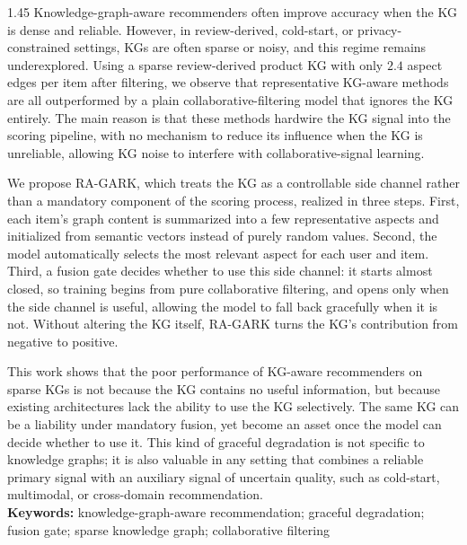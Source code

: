 \begin{spacing}{1.45}
Knowledge-graph-aware recommenders often improve accuracy when the KG is dense and reliable. However, in review-derived, cold-start, or privacy-constrained settings, KGs are often sparse or noisy, and this regime remains underexplored. Using a sparse review-derived product KG with only $2.4$ aspect edges per item after filtering, we observe that representative KG-aware methods are all outperformed by a plain collaborative-filtering model that ignores the KG entirely. The main reason is that these methods hardwire the KG signal into the scoring pipeline, with no mechanism to reduce its influence when the KG is unreliable, allowing KG noise to interfere with collaborative-signal learning.

We propose RA-GARK, which treats the KG as a controllable side channel rather than a mandatory component of the scoring process, realized in three steps. First, each item's graph content is summarized into a few representative aspects and initialized from semantic vectors instead of purely random values. Second, the model automatically selects the most relevant aspect for each user and item. Third, a fusion gate decides whether to use this side channel: it starts almost closed, so training begins from pure collaborative filtering, and opens only when the side channel is useful, allowing the model to fall back gracefully when it is not. Without altering the KG itself, RA-GARK turns the KG's contribution from negative to positive.

This work shows that the poor performance of KG-aware recommenders on sparse KGs is not because the KG contains no useful information, but because existing architectures lack the ability to use the KG selectively. The same KG can be a liability under mandatory fusion, yet become an asset once the model can decide whether to use it. This kind of graceful degradation is not specific to knowledge graphs; it is also valuable in any setting that combines a reliable primary signal with an auxiliary signal of uncertain quality, such as cold-start, multimodal, or cross-domain recommendation.\\[0.5\baselineskip]
\textbf{Keywords:} knowledge-graph-aware recommendation; graceful degradation; fusion gate; sparse knowledge graph; collaborative filtering
\end{spacing}
